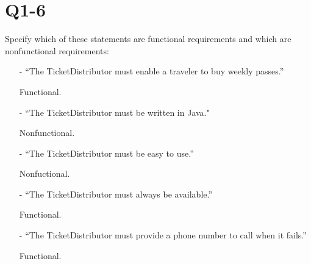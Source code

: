 \section{Q1-6}
Specify which of these statements are functional requirements and which are nonfunctional requirements:

\begin{itemize}


\item[-]“The TicketDistributor must enable a traveler to buy weekly passes.”

Functional.
\item[-]“The TicketDistributor must be written in Java."

Nonfunctional.
\item[-]“The TicketDistributor must be easy to use.”

Nonfuctional.
\item[-]“The TicketDistributor must always be available.”

Functional.
\item[-]“The TicketDistributor must provide a phone number to call when it fails.”

Functional.
\end{itemize}